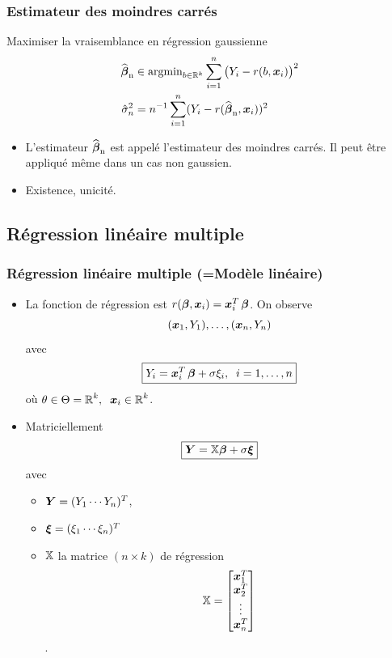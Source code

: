 \begin{frame}
\frametitle{Estimateur des moindres carrés}
Maximiser la \alert{ vraisemblance} en régression gaussienne
\begin{align*}
\operatorname{\widehat{\boldsymbol{\beta}}_n} &\in \mathrm{argmin}_{b \in \mathbb{R}^k} \sum_{i = 1}^n \big(Y_i-r(b,\operatorname{\boldsymbol{x}}_i)\big)^2 \\
\hat{\sigma}_n^2 &= n^{-1} \sum_{i=1}^n (Y_i - r(\operatorname{\widehat{\boldsymbol{\beta}}_n},\operatorname{\boldsymbol{x}}_i))^2
\end{align*}
\begin{itemize}
\item  L'estimateur $\operatorname{\widehat{\boldsymbol{\beta}}_n}$ est appelé l'\alert{estimateur des moindres carrés}. Il peut être appliqué même dans un cas non gaussien.
\item \alert{ Existence, unicité.}
\end{itemize}
\end{frame}


\subsection{Régression linéaire multiple}

\begin{frame}
\frametitle{Régression linéaire multiple (=Modèle linéaire)}
\begin{itemize}
\item La fonction de régression est $r(\boldsymbol{\beta},\operatorname{\boldsymbol{x}}_i) = \operatorname{\boldsymbol{x}}_i^T \boldsymbol{\beta}$.
On observe
$$(\operatorname{\boldsymbol{x}}_1,Y_1),\ldots, (\operatorname{\boldsymbol{x}}_n,Y_n)$$
avec
$$\boxed{Y_i = \operatorname{\boldsymbol{x}}_i^T \boldsymbol{\beta}+ \sigma \xi_i,\;\;i=1,\ldots, n}$$
où $\theta \in \Theta = \operatorname{{\mathbb R}}^k,\;\;\operatorname{\boldsymbol{x}}_i \in \operatorname{{\mathbb R}}^k$.
\item \alert{Matriciellement}
$$\boxed{\operatorname{\boldsymbol{Y}} = \mathbb{X}\boldsymbol{\beta} + \sigma \boldsymbol{\xi}}$$
avec
\begin{itemize}
\item \alert<1>{$\operatorname{\boldsymbol{Y}} = (Y_1 \cdots Y_n)^T$},
\item \alert<2>{$\boldsymbol{\xi} = (\xi_1 \cdots \xi_n)^T$}
\item \alert<3>{$\mathbb{X}$ la matrice $(n\times k)$ de régression
\[
\mathbb{X}= 
\left[
\begin{matrix}
 \operatorname{\boldsymbol{x}}_1^T \\
 \operatorname{\boldsymbol{x}}_2^T \\
 \vdots  \\
 \operatorname{\boldsymbol{x}}_n^T
\end{matrix}
\right]
\].}
\end{itemize}
\end{itemize}
\end{frame}

